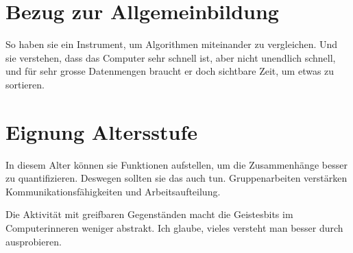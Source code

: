 \documentclass[
	12pt, %
	german, %
]{fphw}
\begin{document}
\section*{Bezug zur Allgemeinbildung}
So haben sie ein Instrument, um Algorithmen miteinander zu vergleichen. Und sie verstehen, dass das Computer sehr schnell ist, aber nicht unendlich schnell, und für sehr grosse Datenmengen braucht er doch sichtbare Zeit, um etwas zu sortieren.

\section*{Eignung Altersstufe}
In diesem Alter können sie Funktionen aufstellen, um die Zusammenhänge besser zu quantifizieren. Deswegen sollten sie das auch tun.
Gruppenarbeiten verstärken Kommunikationsfähigkeiten und Arbeitsaufteilung.

Die Aktivität mit greifbaren Gegenständen macht die Geistesbits im Computerinneren weniger abstrakt. Ich glaube, vieles versteht man besser durch ausprobieren.
\end{document}

